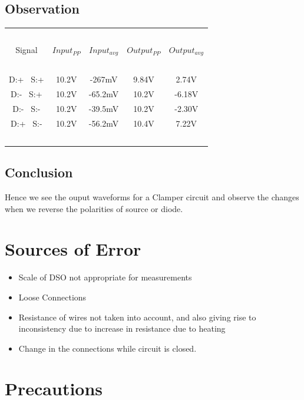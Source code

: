 \documentclass{article}
\begin{document}
\subsection{Observation}
\vspace{5px}
\begin{center}
\begin{tabular}{| c | c | c | c | c |} 
 \hline
    \ & \ & \ & \ & \ \\
    Signal & $Input_{PP}$ & $Input_{avg}$ & $Output_{PP}$ & $Output_{avg}$ \\ [1em]
    \hline
    \ & \ & \ & \ & \ \\
    D:+ \ S:+  & 10.2V & -267mV & 9.84V & 2.74V \\
    D:- \ S:+  & 10.2V & -65.2mV & 10.2V & -6.18V \\
    D:- \ S:-  & 10.2V & -39.5mV & 10.2V & -2.30V \\
    D:+ \ S:-  & 10.2V & -56.2mV & 10.4V & 7.22V \\
    \ & \ & \ & \ & \ \\
 \hline
\end{tabular}
\end{center}

\subsection{Conclusion}
Hence we see the ouput waveforms for a Clamper circuit and observe the changes when we reverse the polarities of source or diode.


\newpage
\vspace{10px}
\section{Sources of Error}
\begin{itemize}
\item Scale of DSO not appropriate for measurements
\item Loose Connections
\item Resistance of wires not taken into account, and also giving rise to inconsistency due to increase in resistance due to heating
\item Change in the connections while circuit is closed.

\end{itemize}

\vspace{5px}

\section{Precautions}
\end{document}
